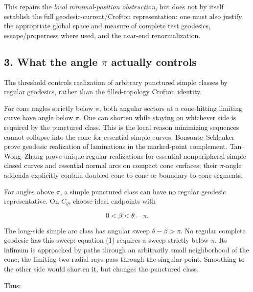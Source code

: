 \documentclass[11pt]{article}
\begin{document}
This repairs the \emph{local minimal-position obstruction}, but does not
by itself establish the full geodesic-current/Crofton representation:
one must also justify the appropriate global space and measure of
complete test geodesics, escape/properness where used, and the near-end
renormalization.

\subsection{\texorpdfstring{3. What the angle \(\pi\) actually
controls}{3. What the angle \textbackslash pi actually controls}}\label{what-the-angle-pi-actually-controls}

The threshold controls realization of arbitrary punctured simple classes
by regular geodesics, rather than the filled-topology Crofton identity.

For cone angles strictly below \(\pi\), both angular sectors at a
cone-hitting limiting curve have angle below \(\pi\). One can shorten
while staying on whichever side is required by the punctured class. This
is the local reason minimizing sequences cannot collapse into the cone
for essential simple curves. Bonsante--Schlenker prove geodesic
realization of laminations in the marked-point complement.
Tan--Wong--Zhang prove unique regular realizations for essential
nonperipheral simple closed curves and essential normal arcs on compact
cone surfaces; their \(\pi\)-angle addenda explicitly contain doubled
cone-to-cone or boundary-to-cone segments.

For angles above \(\pi\), a simple punctured class can have no regular
geodesic representative. On \(C_\theta\), choose ideal endpoints with

\[
0<\beta<\theta-\pi.
\]

The long-side simple arc class has angular sweep \(\theta-\beta>\pi\).
No regular complete geodesic has this sweep: equation (1) requires a
sweep strictly below \(\pi\). Its infimum is approached by paths through
an arbitrarily small neighborhood of the cone; the limiting two radial
rays pass through the singular point. Smoothing to the other side would
shorten it, but changes the punctured class.

Thus:
\end{document}
